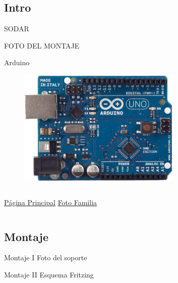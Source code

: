 \documentclass{beamer}
\begin{document}
\subsection{Intro}

\begin{frame}{SODAR}

FOTO DEL MONTAJE
  
\end{frame}

\begin{frame}{Arduino}

  \begin{figure}
    \centering
    \includegraphics [width=0.7\textwidth]{ArduinoUnoSmd.jpg}
  \end{figure}
  \begin{columns}
    \href{http://www.arduino.cc/}{Página Principal}
    \href{http://blog.arduino.cc/wp-content/uploads/2013/11/ArduinoEvolution_make.jpg}{Foto Familia}
  \end{columns}
\end{frame}

\subsection{Montaje}

\begin{frame}{Montaje I}
  Foto del soporte
\end{frame}

\begin{frame}{Montaje II}
  Esquema Fritzing
\end{frame}
\end{document}

